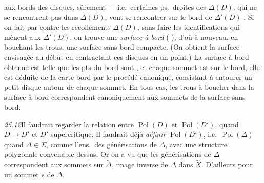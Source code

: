 \documentclass[11pt,a4paper]{article}
\begin{document}
 aux bords des disques, sûrement  --- i.e.\ certaines ps.\ droites des $\Delta(D)$, qui ne se rencontrent pas dans $\Delta(D)$, vont se rencontrer sur le bord de $\Delta'(D)$ \struck{\ill{}}. Si on fait par contre les recollements  \struck{\ill{}} $\Delta(D)$, sans faire les identifications qui mènent aux $\Delta'(D)$, on trouve une \emph{surface à bord} ( ), d'où à nouveau, en bouchant  les trous, une surface sans bord compacte. (On obtient la surface envisagée au début en contractant  ces disques en \struck{\ill{}} un point.) La surface  à bord obtenue est telle que les pts du bord sont  , et chaque sommet est sur le bord, elle est déduite de la carte  bord par le procédé canonique, consistant à entourer un petit disque autour de chaque sommet. En tous cas, les trous à boucher dans la surface à bord correspondent canoniquement aux sommets de la surface sans bord.
\marginal{\ill{} \ill{} \ill{}}

\emph{25.12}\quad Il faudrait regarder la relation entre $\operatorname{Pol}(D)$ et $\operatorname{Pol}(D')$, quand $D \to D'$ et $D'$ supercritique. Il faudrait déjà \emph{définir} $\operatorname{Pol}(D')$, i.e.\ $\operatorname{Pol}(\Delta)$ quand $\Delta \in \Sigma$, comme l'ens.\ des générisations de $\Delta$, avec une structure polygonale convenable dessus. Or on a vu que les \struck{\ill{}} générisations de $\Delta$ correspondent aux sommets sur $\widetilde{\Delta}$, image inverse de $\Delta$ dans $\widetilde{X}$. D'ailleurs pour un sommet $s$ de $\Delta$,
\end{document}
